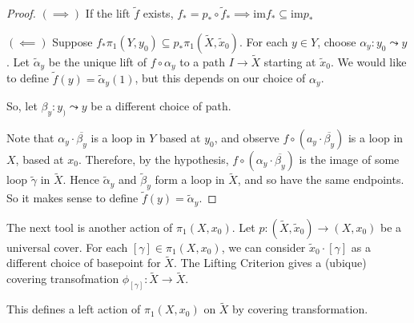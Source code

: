 \documentclass{article}
\numberwithin{nthm}{subsection}
\begin{document}

\begin{proof}
    $(\implies)$ If the lift $\widetilde{f}$ exists, $f_* = p_* \circ \widetilde{f}_* \implies \mathrm{im} f_* \subseteq \mathrm{im} p_*$

    $(\impliedby)$ Suppose $f_* \pi_1(Y, y_0) \subseteq p_* \pi_1 (\widetilde{X}, \widetilde{x}_0)$. For each $y \in Y$, choose $\alpha_y: y_0 \leadsto y$.
    Let $\widetilde{\alpha}_y$ be the unique lift of $f \circ \alpha_y$ to a path $I \to \widetilde{X}$ starting at $\widetilde{x}_0$.
    We would like to define $\widetilde{f}(y) = \widetilde{\alpha}_y(1)$, but this depends on our choice of $\alpha_y$.

    So, let $\beta_y : y_) \leadsto y$ be a different choice of path.

    Note that $\alpha_y \cdot \overline{\beta_y}$ is a loop in $Y$ based at $y_0$, and observe $f \circ (a_y \cdot \overline{\beta_y})$ is a loop in $X$, based at $x_0$. Therefore, by the hypothesis, $f \circ (\alpha_y \cdot \overline{\beta_y})$ is the image of some loop $\widetilde{\gamma}$ in $\widetilde{X}$. Hence $\widetilde{\alpha}_y$ and $\widetilde{\beta}_y$ form a loop in $\widetilde{X}$, and so have the same endpoints. So it makes sense to define $\widetilde{f}(y) = \widetilde{\alpha}_y$.
\end{proof}

The next tool is another action of $\pi_1(X, x_0)$.
Let $p : (\widetilde{X}, \widetilde{x}_0) \to (X, x_0)$ be a universal cover. For each $[\gamma] \in \pi_1(X, x_0)$, we can consider $\widetilde{x}_0 \cdot [\gamma]$ as a different choice of basepoint for $\widetilde{X}$.
The Lifting Criterion gives a (ubique) covering transofmation $\phi_{[\gamma]} : \widetilde{X} \to \widetilde{X}$.

\begin{lemma}
    This defines a left action of $\pi_1(X, x_0)$ on $\widetilde{X}$ by covering transformation.
\end{lemma}
\end{document}
